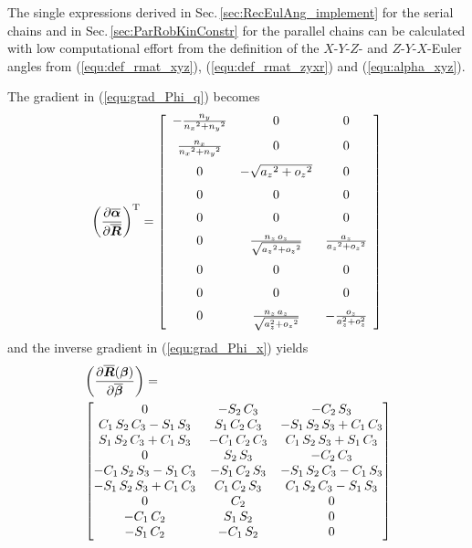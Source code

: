 \documentclass[twocolumn,10pt]{IFTOMM}
\newcommand{\bm}[1]{\boldsymbol{#1}}
\newcommand{\transp}[0]{{\mathrm{T}}}
\begin{document}
The single expressions derived in Sec.\,\ref{sec:RecEulAng_implement} for the serial chains and in Sec.\,\ref{sec:ParRobKinConstr} for the parallel chains can be calculated with low computational effort from the definition of the $X$-$Y$-$Z$- and $Z$-$Y$-$X$-Euler angles from (\ref{equ:def_rmat_xyz}), (\ref{equ:def_rmat_zyxr}) and (\ref{equ:alpha_xyz}).

The gradient in (\ref{equ:grad_Phi_q}) becomes
\begin{equation}
\left(\frac{\partial \overline{\bm{\alpha}}}{\partial \overline{\bm{R}}}\right)^\transp
=
 \left[ \begin {array}{ccc} -{\frac {{n_y}}{{{n_x}}^{2}+{{n_y }}^{2}}}&0&0\\ \noalign{\medskip}{\frac {{n_x}}{{{n_x}}^{2}+{{ n_y}}^{2}}}&0&0\\ \noalign{\medskip}0&-\sqrt {{{a_z}}^{2}+{{ o_z}}^{2}}&0\\ \noalign{\medskip}0&0&0\\ \noalign{\medskip}0&0&0 \\ \noalign{\medskip}0&{\frac {{n_z}\,{o_z}}{\sqrt {{{a_z}}^{ 2}+{{o_z}}^{2}}}}&{\frac {{a_z}}{{{a_z}}^{2}+{{o_z}}^{2}}} \\ \noalign{\medskip}0&0&0\\ \noalign{\medskip}0&0&0 \\ \noalign{\medskip}0&{\frac {{n_z}\,{a_z}}{\sqrt {a_z^{2}+{{o_z}}^{2}}}}&-{\frac {o_z}{a_z^{2}+o_z^{2}} }\end {array} \right] 
\end{equation}
%
and the inverse gradient in (\ref{equ:grad_Phi_x}) yields
%
\begin{align}
&\left(\frac{\partial \overline{\bm{R}}(\bm{\beta})}{\partial \overline{\bm{\beta}}}\right)
=\\
\small
&\begin{bmatrix}
0&-{ S_2}\,{ C_3}&-{ C_2}\,{ S_3}
\\ { C_1}\,{ S_2}\,{ C_3}-{ S_1}\,{ S_3}&{
    S_1}\,{ C_2}\,{ C_3}&-{ S_1}\,{ S_2}\,{ S_3}+{ C_1}\,{
    C_3}\\ { S_1}\,{ S_2}\,{ C_3}+{ C_1}\,{
    S_3}&-{ C_1}\,{ C_2}\,{ C_3}&{ C_1}\,{ S_2}\,{ S_3}+{
    S_1}\,{ C_3}\\ 0&{ S_2}\,{ S_3}&-{ C_2}\,
{ C_3}\\ -{ C_1}\,{ S_2}\,{ S_3}-{ S_1}\,{
    C_3}&-{ S_1}\,{ C_2}\,{ S_3}&-{ S_1}\,{ S_2}\,{ C_3}-{
    C_1}\,{ S_3}\\ -{ S_1}\,{ S_2}\,{ S_3}+{
    C_1}\,{ C_3}&{ C_1}\,{ C_2}\,{ S_3}&{ C_1}\,{ S_2}\,{
    C_3}-{ S_1}\,{ S_3}\\ 0&{ C_2}&0
\\ -{ C_1}\,{ C_2}&{ S_1}\,{ S_2}&0
\\ -{ S_1}\,{ C_2}&-{ C_1}\,{ S_2}&0
\end {bmatrix}  \nonumber
\end{align}
\end{document}
